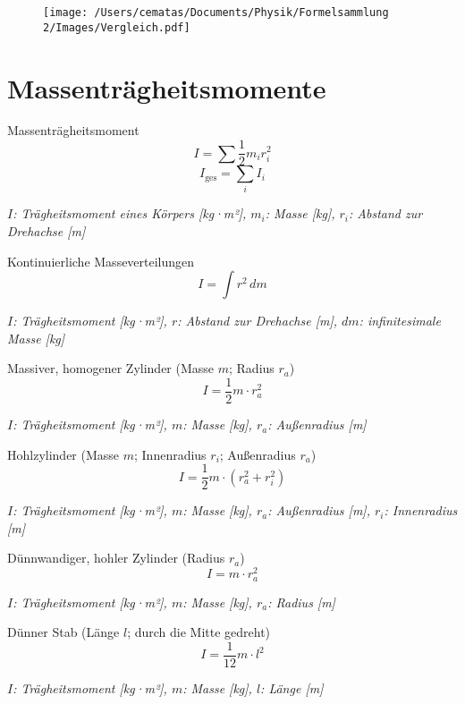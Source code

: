 \documentclass[a4paper,10pt]{article}
\newenvironment{displayformula}
{
	\begin{framed}
		\color{formulaColor}
	}
	{\end{framed}}
\newcommand{\formulalegend}[1]{%
	\par\vspace{0.5ex}%
	{{\color{legendColor}\RaggedRight\small\textit{#1}}}%
	\par\vspace{1.5ex}%
}
\begin{document}
\begin{figure}[h!]
	\centering
	\texttt{[image: /Users/cematas/Documents/Physik/Formelsammlung 2/Images/Vergleich.pdf]}
	\label{fig:beispiel}
\end{figure}

\section{Massenträgheitsmomente}

\begin{displayformula}
	Massenträgheitsmoment
	\[
	I = \sum \frac{1}{2} m_i r_i^2 
	\]
	\[
	I_{\text{ges}} = \sum_i I_i
	\]
\end{displayformula}
\formulalegend{
	\( I \): Trägheitsmoment eines Körpers [kg·m²], \( m_i \): Masse [kg], \( r_i \): Abstand zur Drehachse [m]
}

\begin{displayformula}
	Kontinuierliche Masseverteilungen
	\[
	I = \int r^2 \, dm
	\]
\end{displayformula}
\formulalegend{
	\( I \): Trägheitsmoment [kg·m²], \( r \): Abstand zur Drehachse [m], \( dm \): infinitesimale Masse [kg]
}
\begin{displayformula}
	Massiver, homogener Zylinder (Masse \( m \); Radius \( r_a \))
	\[
	I = \frac{1}{2} m \cdot r_a^2
	\]
\end{displayformula}
\formulalegend{
	\( I \): Trägheitsmoment [kg·m²], \( m \): Masse [kg], \( r_a \): Außenradius [m]
}

\begin{displayformula}
	Hohlzylinder (Masse \( m \); Innenradius \( r_i \); Außenradius \( r_a \))
	\[
	I = \frac{1}{2} m \cdot (r_a^2 + r_i^2)
	\]
\end{displayformula}
\formulalegend{
	\( I \): Trägheitsmoment [kg·m²], \( m \): Masse [kg], \( r_a \): Außenradius [m], \( r_i \): Innenradius [m]
}

\begin{displayformula}
	Dünnwandiger, hohler Zylinder (Radius \( r_a \))
	\[
	I = m \cdot r_a^2
	\]
\end{displayformula}
\formulalegend{
	\( I \): Trägheitsmoment [kg·m²], \( m \): Masse [kg], \( r_a \): Radius [m]
}

\begin{displayformula}
	Dünner Stab (Länge \( l \); durch die Mitte gedreht)
	\[
	I = \frac{1}{12} m \cdot l^2
	\]
\end{displayformula}
\formulalegend{
	\( I \): Trägheitsmoment [kg·m²], \( m \): Masse [kg], \( l \): Länge [m]
}
\end{document}
